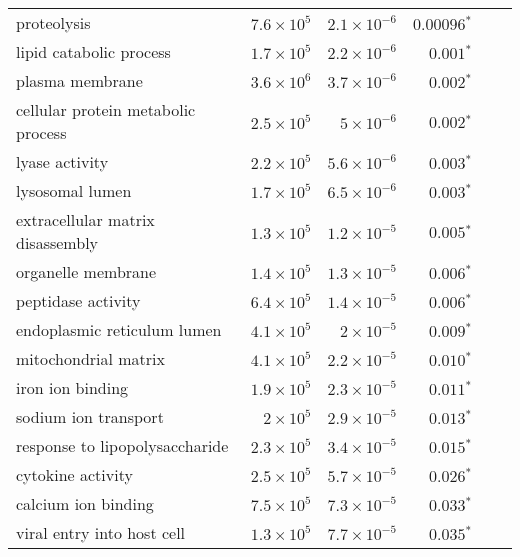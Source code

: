 \documentclass{article}
\begin{document}
\begin{longtable}{|l|r|r|r|r|r|}
                              proteolysis & $7.6\times 10^{5}$ &  $2.1\times 10^{-6}$ &             $\bm{0.00096{^*}}$ \\
                  lipid catabolic process & $1.7\times 10^{5}$ &  $2.2\times 10^{-6}$ &              $\bm{ 0.001{^*}}$ \\
                          plasma membrane & $3.6\times 10^{6}$ &  $3.7\times 10^{-6}$ &              $\bm{ 0.002{^*}}$ \\
       cellular protein metabolic process & $2.5\times 10^{5}$ &   $ 5\times 10^{-6}$ &              $\bm{ 0.002{^*}}$ \\
                           lyase activity & $2.2\times 10^{5}$ &  $5.6\times 10^{-6}$ &              $\bm{ 0.003{^*}}$ \\
                          lysosomal lumen & $1.7\times 10^{5}$ &  $6.5\times 10^{-6}$ &              $\bm{ 0.003{^*}}$ \\
         extracellular matrix disassembly & $1.3\times 10^{5}$ &  $1.2\times 10^{-5}$ &              $\bm{ 0.005{^*}}$ \\
                       organelle membrane & $1.4\times 10^{5}$ &  $1.3\times 10^{-5}$ &              $\bm{ 0.006{^*}}$ \\
                       peptidase activity & $6.4\times 10^{5}$ &  $1.4\times 10^{-5}$ &              $\bm{ 0.006{^*}}$ \\
              endoplasmic reticulum lumen & $4.1\times 10^{5}$ &   $ 2\times 10^{-5}$ &              $\bm{ 0.009{^*}}$ \\
                     mitochondrial matrix & $4.1\times 10^{5}$ &  $2.2\times 10^{-5}$ &              $\bm{ 0.010{^*}}$ \\
                         iron ion binding & $1.9\times 10^{5}$ &  $2.3\times 10^{-5}$ &              $\bm{ 0.011{^*}}$ \\
                     sodium ion transport &  $ 2\times 10^{5}$ &  $2.9\times 10^{-5}$ &              $\bm{ 0.013{^*}}$ \\
           response to lipopolysaccharide & $2.3\times 10^{5}$ &  $3.4\times 10^{-5}$ &              $\bm{ 0.015{^*}}$ \\
                        cytokine activity & $2.5\times 10^{5}$ &  $5.7\times 10^{-5}$ &              $\bm{ 0.026{^*}}$ \\
                      calcium ion binding & $7.5\times 10^{5}$ &  $7.3\times 10^{-5}$ &              $\bm{ 0.033{^*}}$ \\
               viral entry into host cell & $1.3\times 10^{5}$ &  $7.7\times 10^{-5}$ &              $\bm{ 0.035{^*}}$ \\

\end{longtable}
\end{document}
